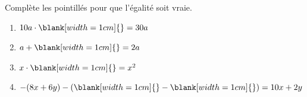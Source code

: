 %
%
    Complète les pointillés pour que l'égalité soit vraie.
    \begin{enumerate}[cols=2]
        \item \(10a\cdot \blank[width=1cm]{} = 30a\)
        \item \(a + \blank[width=1cm]{} = 2a\)
        \item \(x \cdot \blank[width=1cm]{} = x^2\)
        \item \(-(8x+6y)- (\blank[width=1cm]{} - \blank[width=1cm]{} ) = 10x + 2y\)
    \end{enumerate}
